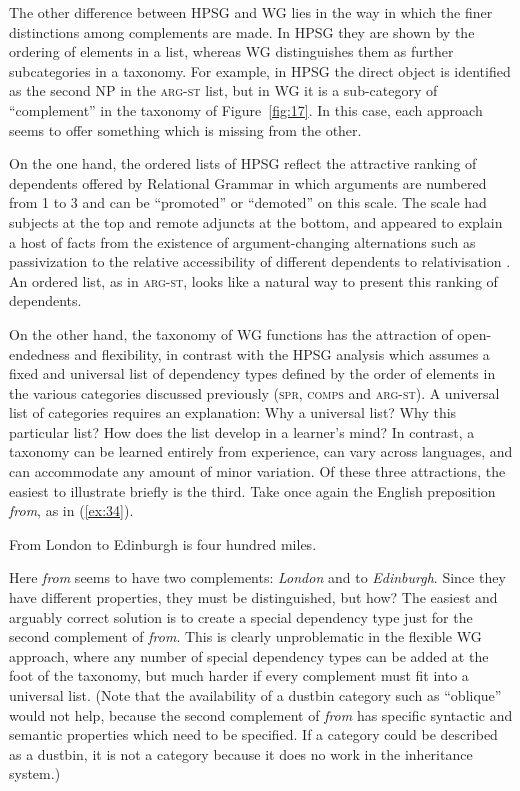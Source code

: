 \documentclass[output=paper]{langscibook}
\begin{document}
The other difference between HPSG and WG lies in the way in which the finer distinctions among complements are made. In HPSG they are shown by the ordering of elements in a list, whereas WG distinguishes them as further subcategories in a taxonomy. For example, in HPSG the direct object is identified as the second NP in the \textsc{arg-st} list, but in WG it is a sub-category of ``complement'' in the taxonomy of Figure~\ref{fig:17}. In this case, each approach seems to offer something which is missing from the other.

On the one hand, the ordered lists of HPSG reflect the attractive ranking of dependents offered by Relational Grammar \citep{PP83a-u,Blake1990} in which arguments are numbered from 1 to 3 and can be ``promoted'' or ``demoted'' on this scale. The scale had subjects at the top and remote adjuncts at the bottom, and appeared to explain a host of facts from the existence of argument-changing alternations such as passivization \citep{Levin93a-u} to the relative accessibility of different dependents to relativisation \citep{KC77a}. An ordered list, as in \textsc{arg-st}, looks like a natural way to present this ranking of dependents.

On the other hand, the taxonomy of WG functions has the attraction of open-endedness and flexibility, in contrast with the HPSG analysis which assumes a fixed and universal list of dependency types defined by the order of elements in the various categories discussed previously (\textsc{spr}, \textsc{comps} and \textsc{arg-st}). A universal list of categories requires an explanation: Why a universal list? Why this particular list? How does the list develop in a learner’s mind? In contrast, a taxonomy can be learned entirely from experience, can vary across languages, and can accommodate any amount of minor variation. Of these three attractions, the easiest to illustrate briefly is the third. Take once again the English preposition \emph{from}, as in (\ref{ex:34}).

\begin{exe}
	\ex \label{ex:34} From London to Edinburgh is four hundred miles.
\end{exe}

Here \emph{from} seems to have two complements: \emph{London} and to \emph{Edinburgh}. Since they have different properties, they must be distinguished, but how? The easiest and arguably correct solution is to create a special dependency type just for the second complement of \emph{from}. This is clearly unproblematic in the flexible WG approach, where any number of special dependency types can be added at the foot of the taxonomy, but much harder if every complement must fit into a universal list. (Note that the availability of a dustbin category such as ``oblique'' would not help, because the second complement of \emph{from} has specific syntactic and semantic properties which need to be specified. If a category could be described as a dustbin, it is not a category because it does no work in the inheritance system.)
\end{document}

